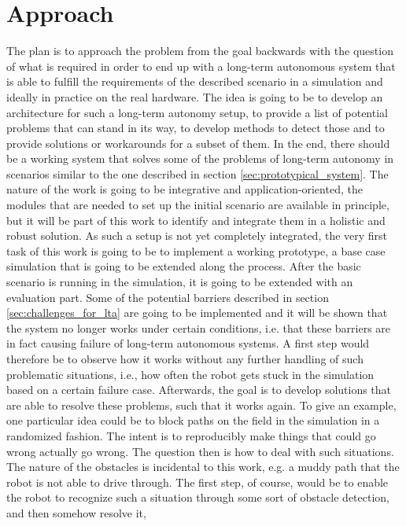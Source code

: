 \documentclass[english, master, expose, utf8]{base/thesis_KBS}
\begin{document}
\section{Approach}

The plan is to approach the problem from the goal backwards with the question of what is required in order to end up with a long-term autonomous system that is
able to fulfill the requirements of the described scenario in a simulation and ideally in practice on the real hardware.
The idea is going to be to develop an architecture for such a long-term autonomy setup, to provide a list of potential problems that can stand in its way,
to develop methods to detect those and to provide solutions or workarounds for a subset of them. In the end, there should be a working system that solves some of 
the problems of long-term autonomy in scenarios similar to the one described in section \ref{sec:prototypical_system}.
The nature of the work is going to be integrative and application-oriented, the modules that are needed to set up the initial scenario are available in principle,
but it will be part of this work to identify and integrate them in a holistic and robust solution. As such a setup is not yet completely integrated, the very first task
of this work is going to be to implement a working prototype, a base case simulation that is going to be extended along the process.
After the basic scenario is running in the simulation, it is going to be extended with an evaluation part. Some of the potential barriers described in section 
\ref{sec:challenges_for_lta} are going to be implemented and it will be shown that the system no longer works under certain conditions, i.e. that these
barriers are in fact causing failure of long-term autonomous systems. A first step would therefore be to observe how it works without any further handling of such 
problematic situations, i.e., how often the robot gets stuck in the simulation based on a certain failure case.
Afterwards, the goal is to develop solutions that are able to resolve these problems, such that it works again. To give an example, one particular idea could be to block paths
on the field in the simulation in a randomized fashion. The intent is to reproducibly make things that could go wrong actually go wrong.
The question then is how to deal with such situations. The nature of the obstacles is incidental to this work, e.g. a muddy path that the robot is not able to drive through.
The first step, of course, would be to enable the robot to recognize such a situation through some sort of obstacle detection, and then somehow resolve it,
\end{document}
